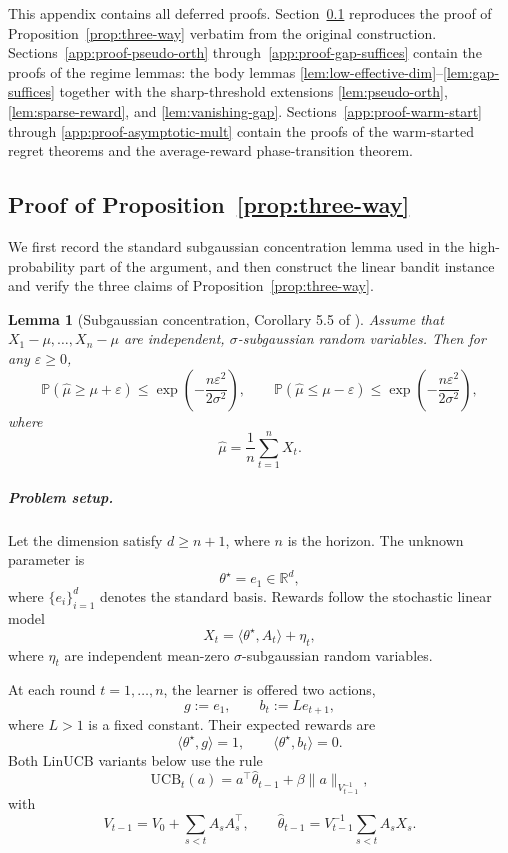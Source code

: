 \documentclass{article}
\newtheorem{lemma}{Lemma}
\theoremstyle{definition}
\theoremstyle{remark}
\theoremstyle{remark}
\begin{document}
This appendix contains all deferred proofs.
Section~\ref{app:proof-three-way} reproduces the proof of
Proposition~\ref{prop:three-way} verbatim from the original
construction. Sections~\ref{app:proof-pseudo-orth}
through~\ref{app:proof-gap-suffices} contain the proofs of the regime
lemmas: the body lemmas
\ref{lem:low-effective-dim}--\ref{lem:gap-suffices} together with the
sharp-threshold extensions \ref{lem:pseudo-orth},
\ref{lem:sparse-reward}, and \ref{lem:vanishing-gap}.
Sections~\ref{app:proof-warm-start}
through \ref{app:proof-asymptotic-mult} contain the proofs of the
warm-started regret theorems and the average-reward phase-transition
theorem.

\subsection{Proof of Proposition~\ref{prop:three-way}}
\label{app:proof-three-way}

We first record the standard subgaussian concentration lemma used in the
high-probability part of the argument, and then construct the linear bandit
instance and verify the three claims of Proposition~\ref{prop:three-way}.

\begin{lemma}[Subgaussian concentration, Corollary 5.5 of \cite{lattimore2020bandit}]
\label{lem:subgaussian}
Assume that $X_1-\mu,\dots,X_n-\mu$ are independent, $\sigma$-subgaussian random variables. Then for any $\varepsilon \ge 0$,
\[
\mathbb{P}\!\left(\hat{\mu} \ge \mu+\varepsilon\right)
\le
\exp\!\left(-\frac{n\varepsilon^2}{2\sigma^2}\right),
\qquad
\mathbb{P}\!\left(\hat{\mu} \le \mu-\varepsilon\right)
\le
\exp\!\left(-\frac{n\varepsilon^2}{2\sigma^2}\right),
\]
where
\[
\hat{\mu}=\frac{1}{n}\sum_{t=1}^n X_t.
\]
\end{lemma}

\subparagraph{Problem setup.}
Let the dimension satisfy $d \ge n+1$, where $n$ is the horizon. The unknown parameter is
\[
\theta^\star = e_1 \in \mathbb{R}^d,
\]
where $\{e_i\}_{i=1}^d$ denotes the standard basis. Rewards follow the stochastic linear model
\[
X_t = \langle \theta^\star, A_t \rangle + \eta_t,
\]
where $\eta_t$ are independent mean-zero $\sigma$-subgaussian random variables.

At each round $t=1,\dots,n$, the learner is offered two actions,
\[
g:=e_1,
\qquad
b_t:=L e_{t+1},
\]
where $L>1$ is a fixed constant. Their expected rewards are
\[
\langle \theta^\star,g\rangle = 1,
\qquad
\langle \theta^\star,b_t\rangle = 0.
\]
Both LinUCB variants below use the rule
\[
\mathrm{UCB}_t(a)
=
a^\top \hat{\theta}_{t-1}
+
\beta \|a\|_{V_{t-1}^{-1}},
\]
with
\[
V_{t-1}=V_0+\sum_{s<t} A_sA_s^\top,
\qquad
\hat{\theta}_{t-1}
=
V_{t-1}^{-1}\sum_{s<t} A_s X_s.
\]
\end{document}
